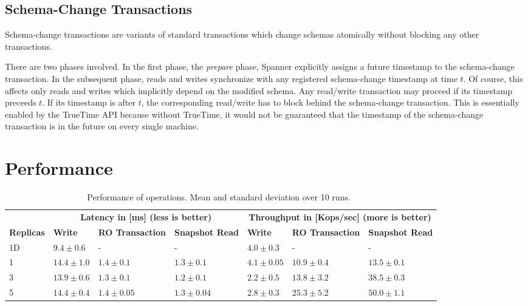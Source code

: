 \documentclass[onecolumn, a4paper, 10pt]{article}
\begin{document}
\subsection{Schema-Change Transactions}
\label{subsec:schema-change-transactions}

Schema-change transactions are variants of standard transactions which change
schemas atomically without blocking any other transactions.

There are two phases involved. In the first phase, the \emph{prepare} phase,
Spanner explicitly assigns a future timestamp to the schema-change transaction.
In the subsequent phase, reads and writes synchronize with any registered
schema-change timestamp at time $t$. Of course, this affects only reads and
writes which implicitly depend on the modified schema. Any read/write transaction
may proceed if its timestamp preceeds $t$. If its timestamp is after $t$, the
corresponding read/write has to block behind the schema-change transaction. This
is essentially enabled by the TrueTime API because without TrueTime, it would
not be guaranteed that the timestamp of the schema-change transaction is in the
future on every single machine.

\section{Performance}
\label{sec:performance}

\begin{table}[ht]
  \centering
  { \footnotesize
    \begin{tabular}{|l||l|l|l||l|l|l|}
      \hline
      & \multicolumn{3}{c||}{{\bfseries Latency in [ms] (less is better)}} &
      \multicolumn{3}{c|}{{\bfseries Throughput in [Kops/sec] (more is better)}}
      \tabularnewline
      \cline{2-7}
      {\bfseries Replicas} & {\bfseries Write} & {\bfseries RO Transaction} &
      {\bfseries Snapshot Read} & {\bfseries Write} &
      {\bfseries RO Transaction} & {\bfseries Snapshot Read} \tabularnewline
      \hline\hline
      1D & $9.4\pm0.6$ & - & - & $4.0\pm0.3$ & - & - \tabularnewline
      \hline
      1 & $14.4\pm1.0$ & $1.4\pm0.1$ & $1.3\pm0.1$ & $4.1\pm0.05$ &
      $10.9\pm0.4$ & $13.5\pm0.1$ \tabularnewline
      \hline
      3 & $13.9\pm0.6$ & $1.3\pm0.1$ & $1.2\pm0.1$ & $2.2\pm0.5$ &
      $13.8\pm3.2$ & $38.5\pm0.3$ \tabularnewline
      \hline
      5 & $14.4\pm0.4$ & $1.4\pm0.05$ & $1.3\pm0.04$ & $2.8\pm0.3$ &
      $25.3\pm5.2$ & $50.0\pm1.1$ \tabularnewline
      \hline
    \end{tabular}
  }
  \caption{Performance of operations. Mean and standard deviation over 10
    runs.~\cite{Corbett:2012}
  }
  \label{tbl:performance-of-operations}
\end{table}
\end{document}
